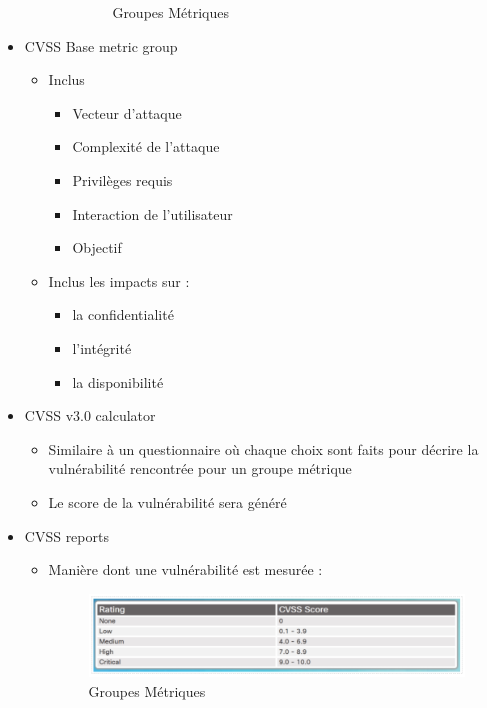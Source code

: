\documentclass[a4paper]{article}
\begin{document}
\begin{itemize}[label=\textbullet, font=\Large]
\begin{itemize}[label=, font=\scriptsize]
\begin{itemize}
\begin{figure}[H]
        \caption{Groupes Métriques}
        \end{figure}
    \end{itemize}
  \end{itemize}
  \item CVSS Base metric group
  \begin{itemize}[label=, font=\scriptsize]
    \item Inclus
    \begin{itemize}
      \item Vecteur d'attaque
      \item Complexité de l'attaque
      \item Privilèges requis
      \item Interaction de l'utilisateur
      \item Objectif
    \end{itemize}
    \item Inclus les impacts sur :
    \begin{itemize}
      \item la confidentialité
      \item l'intégrité
      \item la disponibilité
    \end{itemize}
  \end{itemize}
  \item CVSS v3.0 calculator
  \begin{itemize}[label=, font=\scriptsize]
    \item Similaire à un questionnaire où chaque choix sont faits pour décrire la vulnérabilité rencontrée pour un groupe métrique
    \item Le score de la vulnérabilité sera généré
  \end{itemize}
  \item CVSS reports
  \begin{itemize}[label=, font=\scriptsize]
    \item Manière dont une vulnérabilité est mesurée :
    \begin{figure}[H]
      \centering
      \includegraphics[width=17cm]{images/reports.PNG}
      \caption{Groupes Métriques}
      \end{figure}
  \end{itemize}
\end{itemize}
\end{document}
